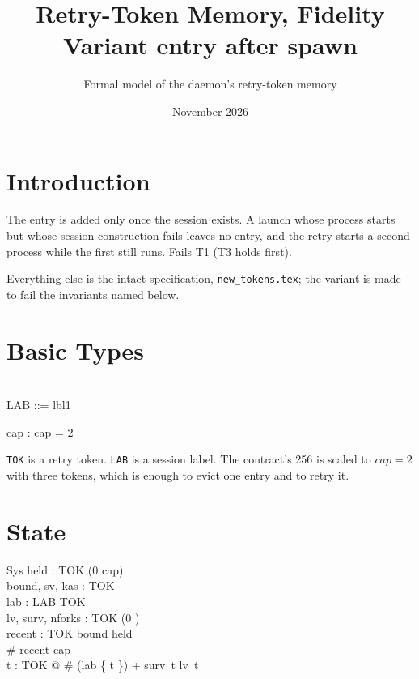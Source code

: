 \documentclass[a4paper,10pt,fleqn]{article}
\begin{document}
\title{Retry-Token Memory, Fidelity Variant entry after spawn}
\author{Formal model of the daemon's retry-token memory}
\date{November 2026}
\maketitle

\section{Introduction}

The entry is added only once the session exists. A launch whose process starts but whose session construction fails leaves no entry, and the retry starts a second process while the first still runs. Fails T1 (T3 holds first).

Everything else is the intact specification, \texttt{new\_tokens.tex}; the variant is made to fail the invariants named below.

\section{Basic Types}

\begin{zed}
  [TOK] \\
  LAB ::= lbl1
\end{zed}

\begin{axdef}
  cap : \nat
\where
  cap = 2
\end{axdef}

\texttt{TOK} is a retry token.  \texttt{LAB} is a session label.  The
contract's 256 is scaled to $cap = 2$ with three tokens, which is enough to
evict one entry and to retry it.

\section{State}

\begin{schema}{Sys}
  held : TOK \pfun (0 \upto cap) \\
  bound, sv, kas : \power TOK \\
  lab : LAB \pfun TOK \\
  lv, surv, nforks : TOK \fun (0 ) \\
  recent : \seq TOK
\where
  bound \subseteq \dom held \\
  \# recent \leq cap \\
  \forall t : TOK @ \# (lab \rres \{ t \}) + surv~t \leq lv~t
\end{schema}
\end{document}

